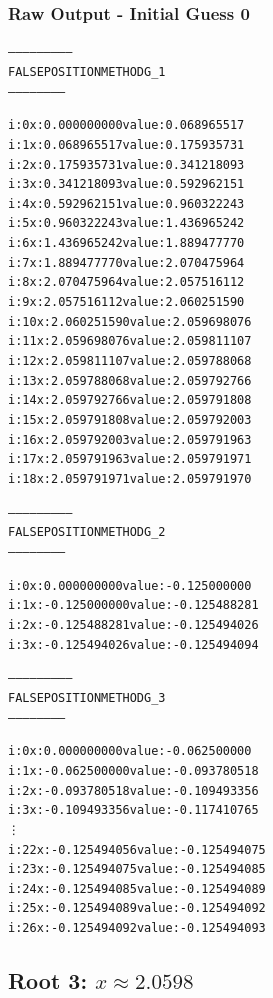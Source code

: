\documentclass[11pt]{article} %
\begin{document}
\subsubsection*{Raw Output - Initial Guess 0}
\begin{alltt}
 

--------------------------
 FALSE POSITION METHOD G_1
 -----------------------


i: 0	x: 0.000000000	value: 0.068965517
i: 1	x: 0.068965517	value: 0.175935731
i: 2	x: 0.175935731	value: 0.341218093
i: 3	x: 0.341218093	value: 0.592962151
i: 4	x: 0.592962151	value: 0.960322243
i: 5	x: 0.960322243	value: 1.436965242
i: 6	x: 1.436965242	value: 1.889477770
i: 7	x: 1.889477770	value: 2.070475964
i: 8	x: 2.070475964	value: 2.057516112
i: 9	x: 2.057516112	value: 2.060251590
i: 10	x: 2.060251590	value: 2.059698076
i: 11	x: 2.059698076	value: 2.059811107
i: 12	x: 2.059811107	value: 2.059788068
i: 13	x: 2.059788068	value: 2.059792766
i: 14	x: 2.059792766	value: 2.059791808
i: 15	x: 2.059791808	value: 2.059792003
i: 16	x: 2.059792003	value: 2.059791963
i: 17	x: 2.059791963	value: 2.059791971
i: 18	x: 2.059791971	value: 2.059791970


--------------------------
 FALSE POSITION METHOD G_2
 -----------------------


i: 0	x: 0.000000000	value: -0.125000000
i: 1	x: -0.125000000	value: -0.125488281
i: 2	x: -0.125488281	value: -0.125494026
i: 3	x: -0.125494026	value: -0.125494094


--------------------------
 FALSE POSITION METHOD G_3
 -----------------------


i: 0	x: 0.000000000	value: -0.062500000
i: 1	x: -0.062500000	value: -0.093780518
i: 2	x: -0.093780518	value: -0.109493356
i: 3	x: -0.109493356	value: -0.117410765
\vdots
i: 22	x: -0.125494056	value: -0.125494075
i: 23	x: -0.125494075	value: -0.125494085
i: 24	x: -0.125494085	value: -0.125494089
i: 25	x: -0.125494089	value: -0.125494092
i: 26	x: -0.125494092	value: -0.125494093

\end{alltt}
\subsection*{Root 3: $x \approx 2.0598$}
\end{document}
